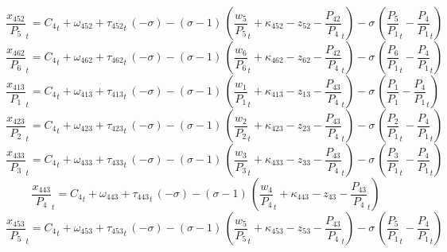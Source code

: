 \begin{dmath}
{{\frac{x_{452}}{P_{5}}}}_{t}={{C_{4}}}_{t}+{{\omega_{452}}}+{{\tau_{452}}}_{t}\, \left(-{{\sigma}}\right)-\left({{\sigma}}-1\right)\, \left({{\frac{w_{5}}{P_{5}}}}_{t}+{{\kappa_{452}}}-{{z_{52}}}-{{\frac{P_{42}}{P_{4}}}}_{t}\right)-{{\sigma}}\, \left({{\frac{P_{5}}{P_{1}}}}_{t}-{{\frac{P_{4}}{P_{1}}}}_{t}\right)
\end{dmath}
\begin{dmath}
{{\frac{x_{462}}{P_{6}}}}_{t}={{C_{4}}}_{t}+{{\omega_{462}}}+{{\tau_{462}}}_{t}\, \left(-{{\sigma}}\right)-\left({{\sigma}}-1\right)\, \left({{\frac{w_{6}}{P_{6}}}}_{t}+{{\kappa_{462}}}-{{z_{62}}}-{{\frac{P_{42}}{P_{4}}}}_{t}\right)-{{\sigma}}\, \left({{\frac{P_{6}}{P_{1}}}}_{t}-{{\frac{P_{4}}{P_{1}}}}_{t}\right)
\end{dmath}
\begin{dmath}
{{\frac{x_{413}}{P_{1}}}}_{t}={{C_{4}}}_{t}+{{\omega_{413}}}+{{\tau_{413}}}_{t}\, \left(-{{\sigma}}\right)-\left({{\sigma}}-1\right)\, \left({{\frac{w_{1}}{P_{1}}}}_{t}+{{\kappa_{413}}}-{{z_{13}}}-{{\frac{P_{43}}{P_{4}}}}_{t}\right)-{{\sigma}}\, \left({{\frac{P_{1}}{P_{1}}}}-{{\frac{P_{4}}{P_{1}}}}_{t}\right)
\end{dmath}
\begin{dmath}
{{\frac{x_{423}}{P_{2}}}}_{t}={{C_{4}}}_{t}+{{\omega_{423}}}+{{\tau_{423}}}_{t}\, \left(-{{\sigma}}\right)-\left({{\sigma}}-1\right)\, \left({{\frac{w_{2}}{P_{2}}}}_{t}+{{\kappa_{423}}}-{{z_{23}}}-{{\frac{P_{43}}{P_{4}}}}_{t}\right)-{{\sigma}}\, \left({{\frac{P_{2}}{P_{1}}}}_{t}-{{\frac{P_{4}}{P_{1}}}}_{t}\right)
\end{dmath}
\begin{dmath}
{{\frac{x_{433}}{P_{3}}}}_{t}={{C_{4}}}_{t}+{{\omega_{433}}}+{{\tau_{433}}}_{t}\, \left(-{{\sigma}}\right)-\left({{\sigma}}-1\right)\, \left({{\frac{w_{3}}{P_{3}}}}_{t}+{{\kappa_{433}}}-{{z_{33}}}-{{\frac{P_{43}}{P_{4}}}}_{t}\right)-{{\sigma}}\, \left({{\frac{P_{3}}{P_{1}}}}_{t}-{{\frac{P_{4}}{P_{1}}}}_{t}\right)
\end{dmath}
\begin{dmath}
{{\frac{x_{443}}{P_{4}}}}_{t}={{C_{4}}}_{t}+{{\omega_{443}}}+{{\tau_{443}}}_{t}\, \left(-{{\sigma}}\right)-\left({{\sigma}}-1\right)\, \left({{\frac{w_{4}}{P_{4}}}}_{t}+{{\kappa_{443}}}-{{z_{43}}}-{{\frac{P_{43}}{P_{4}}}}_{t}\right)
\end{dmath}
\begin{dmath}
{{\frac{x_{453}}{P_{5}}}}_{t}={{C_{4}}}_{t}+{{\omega_{453}}}+{{\tau_{453}}}_{t}\, \left(-{{\sigma}}\right)-\left({{\sigma}}-1\right)\, \left({{\frac{w_{5}}{P_{5}}}}_{t}+{{\kappa_{453}}}-{{z_{53}}}-{{\frac{P_{43}}{P_{4}}}}_{t}\right)-{{\sigma}}\, \left({{\frac{P_{5}}{P_{1}}}}_{t}-{{\frac{P_{4}}{P_{1}}}}_{t}\right)
\end{dmath}
